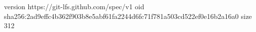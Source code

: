 version https://git-lfs.github.com/spec/v1
oid sha256:2ad9effc4b362f903b8e5abf61fa2244d6fc71f781a503cd522ef0e16b2a16a0
size 312
